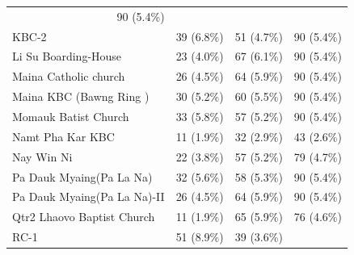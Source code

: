 \documentclass{article}
\begin{document}
\begin{table}[!h]
\begin{tabular}{llll}
  \multicolumn{1}{r}{90 (5.4\%)} \\
\multicolumn{1}{l}{\hspace{1em}KBC-2} &
  \multicolumn{1}{r}{39 (6.8\%)} &
  \multicolumn{1}{r}{51 (4.7\%)} &
  \multicolumn{1}{r}{90 (5.4\%)} \\
\multicolumn{1}{l}{\hspace{1em}Li Su Boarding-House} &
  \multicolumn{1}{r}{23 (4.0\%)} &
  \multicolumn{1}{r}{67 (6.1\%)} &
  \multicolumn{1}{r}{90 (5.4\%)} \\
\multicolumn{1}{l}{\hspace{1em}Maina Catholic church} &
  \multicolumn{1}{r}{26 (4.5\%)} &
  \multicolumn{1}{r}{64 (5.9\%)} &
  \multicolumn{1}{r}{90 (5.4\%)} \\
\multicolumn{1}{l}{\hspace{1em}Maina KBC (Bawng Ring )} &
  \multicolumn{1}{r}{30 (5.2\%)} &
  \multicolumn{1}{r}{60 (5.5\%)} &
  \multicolumn{1}{r}{90 (5.4\%)} \\
\multicolumn{1}{l}{\hspace{1em}Momauk Batist Church} &
  \multicolumn{1}{r}{33 (5.8\%)} &
  \multicolumn{1}{r}{57 (5.2\%)} &
  \multicolumn{1}{r}{90 (5.4\%)} \\
\multicolumn{1}{l}{\hspace{1em}Namt Pha Kar KBC} &
  \multicolumn{1}{r}{11 (1.9\%)} &
  \multicolumn{1}{r}{32 (2.9\%)} &
  \multicolumn{1}{r}{43 (2.6\%)} \\
\multicolumn{1}{l}{\hspace{1em}Nay Win Ni} &
  \multicolumn{1}{r}{22 (3.8\%)} &
  \multicolumn{1}{r}{57 (5.2\%)} &
  \multicolumn{1}{r}{79 (4.7\%)} \\
\multicolumn{1}{l}{\hspace{1em}Pa Dauk Myaing(Pa La Na)} &
  \multicolumn{1}{r}{32 (5.6\%)} &
  \multicolumn{1}{r}{58 (5.3\%)} &
  \multicolumn{1}{r}{90 (5.4\%)} \\
\multicolumn{1}{l}{\hspace{1em}Pa Dauk Myaing(Pa La Na)-II} &
  \multicolumn{1}{r}{26 (4.5\%)} &
  \multicolumn{1}{r}{64 (5.9\%)} &
  \multicolumn{1}{r}{90 (5.4\%)} \\
\multicolumn{1}{l}{\hspace{1em}Qtr2 Lhaovo Baptist Church} &
  \multicolumn{1}{r}{11 (1.9\%)} &
  \multicolumn{1}{r}{65 (5.9\%)} &
  \multicolumn{1}{r}{76 (4.6\%)} \\
\multicolumn{1}{l}{\hspace{1em}RC-1} &
  \multicolumn{1}{r}{51 (8.9\%)} &
  \multicolumn{1}{r}{39 (3.6\%)} &

\end{tabular}
\end{table}
\end{document}
